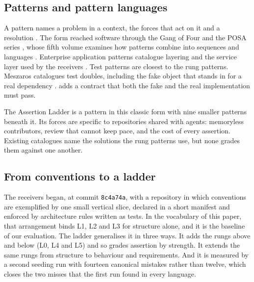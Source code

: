 \subsection{Patterns and pattern languages}

A pattern names a problem in a context, the forces that act on it and a resolution
\citep{alexander1977pattern}. The form reached software through the Gang of Four
\citep{gamma1994design} and the POSA series \citep{buschmann1996posa}, whose fifth volume
examines how patterns combine into sequences and languages \citep{buschmann2007posa5}.
Enterprise application patterns catalogue layering and the service layer used by the receivers
\citep{fowler2002peaa}. Test patterns are closest to the rung patterns. Meszaros catalogues test
doubles, including the fake object that stands in for a real dependency \citep{meszaros2007xunit}.
 adds a contract that both the fake and the real implementation must
pass.

The Assertion Ladder is a pattern in this classic form with nine smaller patterns beneath it.
Its forces are specific to repositories shared with agents: memoryless contributors, review
that cannot keep pace, and the cost of every assertion. Existing catalogues name the solutions
the rung patterns use, but none grades them against one another.

\subsection{From conventions to a ladder}

The receivers began, at commit \texttt{8c4a74a}, with a repository in which conventions are
exemplified by one small vertical slice, declared in a short manifest and enforced by
architecture rules written as tests. In the vocabulary of this paper, that arrangement binds L1,
L2 and L3 for structure alone, and it is the baseline of our evaluation. The ladder generalises
it in three ways. It adds the rungs above and below (L0, L4 and L5) and so grades assertion by
strength. It extends the same rungs from structure to behaviour and requirements. And it is
measured by a second seeding run with fourteen canonical mistakes rather than twelve, which
closes the two misses that the first run found in every language.

